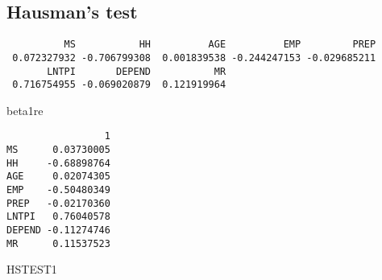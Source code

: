 \documentclass[]{book}
\newenvironment{Shaded}{\begin{snugshade}}{\end{snugshade}}
\newcommand{\DecValTok}[1]{\textcolor[rgb]{0.00,0.00,0.81}{#1}}
\newcommand{\KeywordTok}[1]{\textcolor[rgb]{0.13,0.29,0.53}{\textbf{#1}}}
\newcommand{\NormalTok}[1]{#1}
\newcommand{\OperatorTok}[1]{\textcolor[rgb]{0.81,0.36,0.00}{\textbf{#1}}}
\begin{document}
\hypertarget{hausmans-test}{%
\subsection{Hausman's test}\label{hausmans-test}}

\begin{Shaded}
\end{Shaded}

\begin{verbatim}
          MS           HH          AGE          EMP         PREP 
 0.072327932 -0.706799308  0.001839538 -0.244247153 -0.029685211 
       LNTPI       DEPEND           MR 
 0.716754955 -0.069020879  0.121919964 
\end{verbatim}

\begin{Shaded}
\begin{Highlighting}[]
\NormalTok{beta1re}
\end{Highlighting}
\end{Shaded}

\begin{verbatim}
                 1
MS      0.03730005
HH     -0.68898764
AGE     0.02074305
EMP    -0.50480349
PREP   -0.02170360
LNTPI   0.76040578
DEPEND -0.11274746
MR      0.11537523
\end{verbatim}

\begin{Shaded}
\begin{Highlighting}[]
\NormalTok{HSTEST1}
\end{Highlighting}
\end{Shaded}
\end{document}
